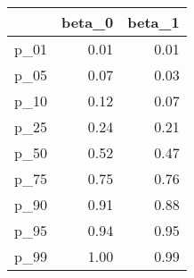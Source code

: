 \begin{table}[ht]
\centering
\begin{tabular}{rrr}
  \hline
 & beta\_0 & beta\_1 \\ 
  \hline
p\_01 & 0.01 & 0.01 \\ 
  p\_05 & 0.07 & 0.03 \\ 
  p\_10 & 0.12 & 0.07 \\ 
  p\_25 & 0.24 & 0.21 \\ 
  p\_50 & 0.52 & 0.47 \\ 
  p\_75 & 0.75 & 0.76 \\ 
  p\_90 & 0.91 & 0.88 \\ 
  p\_95 & 0.94 & 0.95 \\ 
  p\_99 & 1.00 & 0.99 \\ 
   \hline
\end{tabular}
\end{table}

